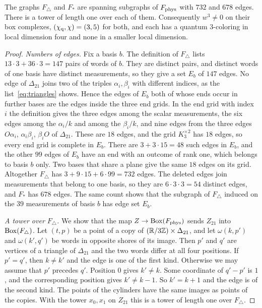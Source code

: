\begin{theorem}\label{thm:star}
The graphs $F_\triangle$ and $F_*$ are spanning subgraphs of $F_{\rm phys}$ with $732$ and $678$ edges. There is a tower of length one over each of them. Consequently $w^3\ne0$ on their box complexes, $(\chi_{\mathrm q},\chi)=(3,5)$ for both, and each has a quantum $3$-coloring in local dimension four and none in a smaller local dimension.
\end{theorem}
\begin{proof}
\emph{Numbers of edges.} Fix a basis $b$. The definition of $F_\triangle$ lists $13\cdot3+36\cdot3=147$ pairs of words of $b$. They are distinct pairs, and distinct words of one basis have distinct measurements, so they give a set $E_b$ of $147$ edges. No edge of $\Delta_{21}$ joins two of the triples $\alpha_i,\beta_i$ with different indices, as the list~\eqref{eq:triangles} shows. Hence the edges of $E_b$ both of whose ends occur in further bases are the edges inside the three end grids. In the end grid with index $i$ the definition gives the three edges among the scalar measurements, the six edges among the $\alpha_i/k$ and among the $\beta_i/k$, and nine edges from the three edges $O\alpha_i$, $\alpha_i\beta_i$, $\beta_iO$ of $\Delta_{21}$. These are $18$ edges, and the grid $K_3^{\times2}$ has $18$ edges, so every end grid is complete in $E_b$. There are $3+3\cdot15=48$ such edges in $E_b$, and the other $99$ edges of $E_b$ have an end with an outcome of rank one, which belongs to basis $b$ only. Two bases that share a plane give the same $18$ edges on its grid. Altogether $F_\triangle$ has $3+9\cdot15+6\cdot99=732$ edges. The deleted edges join measurements that belong to one basis, so they are $6\cdot3\cdot3=54$ distinct edges, and $F_*$ has $678$ edges. The same count shows that the subgraph of $F_\triangle$ induced on the $39$ measurements of basis $b$ has edge set $E_b$.

\emph{A tower over $F_\triangle$.} We show that the map $Z\to\operatorname{Box}(F_{\rm phys})$ sends $Z_{21}$ into $\operatorname{Box}(F_\triangle)$. Let $(t,p)$ be a point of a copy of $(\mathbb R/3\mathbb Z)\times\Delta_{21}$, and let $\omega(k,p')$ and $\omega(k',q')$ be words in opposite shores of its image. Then $p'$ and $q'$ are vertices of a triangle of $\Delta_{21}$ and the two words differ at all four positions. If $p'=q'$, then $k\ne k'$ and the edge is one of the first kind. Otherwise we may assume that $p'$ precedes $q'$. Position $0$ gives $k'\ne k$. Some coordinate of $q'-p'$ is $1$, and the corresponding position gives $k'\ne k-1$. So $k'=k+1$ and the edge is of the second kind. The points of the cylinders have the same images as points of the copies. With the tower $x_0,x_1$ on $Z_{21}$ this is a tower of length one over $F_\triangle$.


\end{proof}
